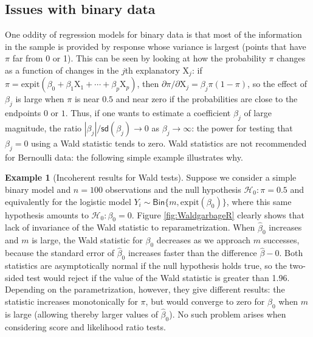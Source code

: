 \documentclass[
  11pt,
  letterpaper,
]{book}
\theoremstyle{definition}
\theoremstyle{definition}
\newtheorem{example}{Example}[chapter]
\theoremstyle{definition}
\theoremstyle{remark}
\begin{document}
\hypertarget{issues-with-binary-data}{%
\subsection{Issues with binary data}\label{issues-with-binary-data}}

One oddity of regression models for binary data is that most of the information in the sample is provided by response whose variance is largest (points that have \(\pi\) far from 0 or 1). This can be seen by looking at how the probability \(\pi\) changes as a function of changes in the \(j\)th explanatory \(\mathrm{X}_j\): if \(\pi = \mathrm{expit}(\beta_0 + \beta_1\mathrm{X}_1 + \cdots + \beta_p\mathrm{X}_p)\), then \(\partial \pi/\partial \mathrm{X}_j = \beta_j \pi(1-\pi)\), so the effect of \(\beta_j\) is large when \(\pi\) is near \(0.5\) and near zero if the probabilities are close to the endpoints \(0\) or \(1\). Thus, if one wants to estimate a coefficient \(\beta_j\) of large magnitude, the ratio \(|\beta_j|/\mathsf{sd}(\beta_j) \to 0\) as \(\beta_j \to \infty\): the power for testing that \(\beta_j=0\) using a Wald statistic tends to zero. Wald statistics are not recommended for Bernoulli data: the following simple example illustrates why.

\begin{example}[Incoherent results for Wald tests]
\protect\hypertarget{exm:waldgarbage}{}{\label{exm:waldgarbage} {} }Suppose we consider a simple binary model and \(n=100\) observations and the null hypothesis \(\mathscr{H}_0:\pi = 0.5\) and equivalently for the logistic model \(Y_i \sim \mathsf{Bin}\{m, \mathrm{expit}(\beta_0)\}\), where this same hypothesis amounts to \(\mathscr{H}_0:\beta_0=0\). Figure \ref{fig:WaldgarbageR} clearly shows that lack of invariance of the Wald statistic to reparametrization. When \(\widehat{\beta}_0\) increases and \(m\) is large, the Wald statistic for \(\beta_0\) decreases as we approach \(m\) successes, because the standard error of \(\widehat{\beta}_0\) increases faster than the difference \(\widehat{\beta}-0\). Both statistics are asymptotically normal if the null hypothesis holds true, so the two-sided test would reject if the value of the Wald statistic is greater than 1.96. Depending on the parametrization, however, they give different results: the statistic increases monotonically for \(\pi\), but would converge to zero for \(\beta_0\) when \(m\) is large (allowing thereby larger values of \(\widehat{\beta}_0\)). No such problem arises when considering score and likelihood ratio tests.
\end{example}
\end{document}
